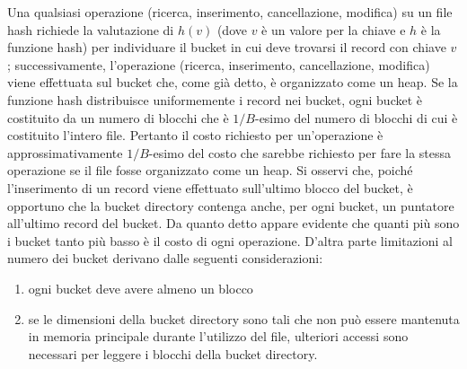 Una qualsiasi operazione (ricerca, inserimento, cancellazione, modifica) su un file hash richiede la
valutazione di $h(v)$ (dove $v$ è un valore per la chiave e $h$ è la funzione hash) per individuare il bucket
in cui deve trovarsi il record con chiave $v$; successivamente, l'operazione (ricerca, inserimento,
cancellazione, modifica) viene effettuata sul bucket che, come già detto, è organizzato come un
heap. Se la funzione hash distribuisce uniformemente i record nei bucket, ogni bucket è costituito
da un numero di blocchi che è $1/B$-esimo del numero di blocchi di cui è costituito l'intero file.
Pertanto il costo richiesto per un'operazione è approssimativamente $1/B$-esimo del costo che
sarebbe richiesto per fare la stessa operazione se il file fosse organizzato come un heap. Si osservi
che, poiché l'inserimento di un record viene effettuato sull'ultimo blocco del bucket, è opportuno
che la bucket directory contenga anche, per ogni bucket, un puntatore all'ultimo record del bucket.
Da quanto detto appare evidente che quanti più sono i bucket tanto più basso è il costo di ogni
operazione. D'altra parte limitazioni al numero dei bucket derivano dalle seguenti considerazioni:
\begin{enumerate}
 \item ogni bucket deve avere almeno un blocco
\item se le dimensioni della bucket directory sono tali che non può essere mantenuta in memoria
principale durante l'utilizzo del file, ulteriori accessi sono necessari per leggere i blocchi della
bucket directory.
\end{enumerate}

